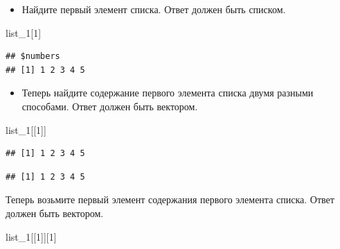 \documentclass[]{book}
\newenvironment{Shaded}{\begin{snugshade}}{\end{snugshade}}
\newcommand{\DecValTok}[1]{\textcolor[rgb]{0.00,0.00,0.81}{#1}}
\newcommand{\OperatorTok}[1]{\textcolor[rgb]{0.81,0.36,0.00}{\textbf{#1}}}
\newcommand{\NormalTok}[1]{#1}
\providecommand{\tightlist}{%
  \setlength{\itemsep}{0pt}\setlength{\parskip}{0pt}}
\begin{document}
\begin{itemize}
\tightlist
\item
  Найдите первый элемент списка. Ответ должен быть списком.
\end{itemize}

\begin{Shaded}
\begin{Highlighting}[]
\NormalTok{list_}\DecValTok{1}\NormalTok{[}\DecValTok{1}\NormalTok{]}
\end{Highlighting}
\end{Shaded}

\begin{verbatim}
## $numbers
## [1] 1 2 3 4 5
\end{verbatim}

\begin{itemize}
\tightlist
\item
  Теперь найдите содержание первого элемента списка двумя разными
  способами. Ответ должен быть вектором.
\end{itemize}

\begin{Shaded}
\begin{Highlighting}[]
\NormalTok{list_}\DecValTok{1}\NormalTok{[[}\DecValTok{1}\NormalTok{]]}
\end{Highlighting}
\end{Shaded}

\begin{verbatim}
## [1] 1 2 3 4 5
\end{verbatim}

\begin{Shaded}
\end{Shaded}

\begin{verbatim}
## [1] 1 2 3 4 5
\end{verbatim}

Теперь возьмите первый элемент содержания первого элемента списка. Ответ
должен быть вектором.

\begin{Shaded}
\begin{Highlighting}[]
\NormalTok{list_}\DecValTok{1}\NormalTok{[[}\DecValTok{1}\NormalTok{]][}\DecValTok{1}\NormalTok{]}
\end{Highlighting}
\end{Shaded}
\end{document}
